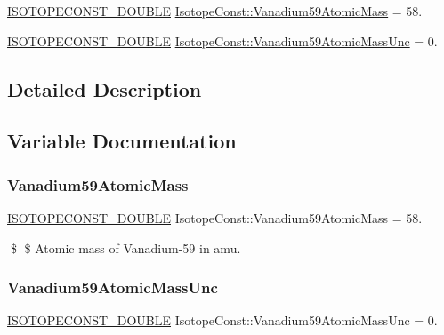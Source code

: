 \begin{DoxyCompactItemize}
\item 
\mbox{\hyperlink{group___isotope_const-_macros_ga8f45a7272ce02c0b4c65c44636ed719a}{I\+S\+O\+T\+O\+P\+E\+C\+O\+N\+S\+T\+\_\+\+D\+O\+U\+B\+LE}} \mbox{\hyperlink{group___isotope_const-_vanadium-_v59_ga7ee0f096d8153b4115be2948f1ffdad1}{Isotope\+Const\+::\+Vanadium59\+Atomic\+Mass}} = 58.
\item 
\mbox{\hyperlink{group___isotope_const-_macros_ga8f45a7272ce02c0b4c65c44636ed719a}{I\+S\+O\+T\+O\+P\+E\+C\+O\+N\+S\+T\+\_\+\+D\+O\+U\+B\+LE}} \mbox{\hyperlink{group___isotope_const-_vanadium-_v59_gab38fe0a2f1fd953766d86dc35f28d8cc}{Isotope\+Const\+::\+Vanadium59\+Atomic\+Mass\+Unc}} = 0.
\end{DoxyCompactItemize}


\subsection{Detailed Description}


\subsection{Variable Documentation}
\mbox{\label{group___isotope_const-_vanadium-_v59_ga7ee0f096d8153b4115be2948f1ffdad1}} 
\subsubsection{\texorpdfstring{Vanadium59\+Atomic\+Mass}{Vanadium59AtomicMass}}
{\footnotesize\ttfamily \mbox{\hyperlink{group___isotope_const-_macros_ga8f45a7272ce02c0b4c65c44636ed719a}{I\+S\+O\+T\+O\+P\+E\+C\+O\+N\+S\+T\+\_\+\+D\+O\+U\+B\+LE}} Isotope\+Const\+::\+Vanadium59\+Atomic\+Mass = 58.}

\$ \$ Atomic mass of Vanadium-\/59 in amu. \mbox{\label{group___isotope_const-_vanadium-_v59_gab38fe0a2f1fd953766d86dc35f28d8cc}} 
\subsubsection{\texorpdfstring{Vanadium59\+Atomic\+Mass\+Unc}{Vanadium59AtomicMassUnc}}
{\footnotesize\ttfamily \mbox{\hyperlink{group___isotope_const-_macros_ga8f45a7272ce02c0b4c65c44636ed719a}{I\+S\+O\+T\+O\+P\+E\+C\+O\+N\+S\+T\+\_\+\+D\+O\+U\+B\+LE}} Isotope\+Const\+::\+Vanadium59\+Atomic\+Mass\+Unc = 0.}

